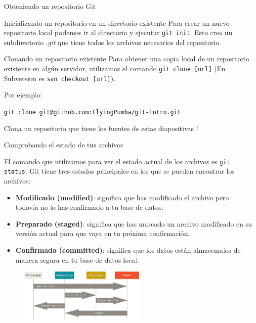 \documentclass{beamer}
\begin{document}
\begin{frame}{Obteniendo un repositorio Git}

    \begin{block}{Inicializando un repositorio en un directorio existente}
        Para crear un nuevo repositorio local podemos ir al directorio y ejecutar
        \texttt{git init}. Esto crea un subdirectorio \textit{.git} que tiene todos
        los archivos necesarios del repositorio.
    \end{block}

    \begin{block}{Clonando un repositorio existente}
        Para obtener una copia local de un repositorio existente en algún servidor,
        utilizamos el comando \texttt{git clone [url]} (En Subversion es \texttt{svn checkout [url]}).

        Por ejemplo:

        \vspace{0.5em}

        \texttt{git clone git@github.com:FlyingPumba/git-intro.git}

        \vspace{0.5em}

        Clona un repositorio que tiene los fuentes de estas diapositivas !

    \end{block}

\end{frame}

\begin{frame}{Comprobando el estado de tus archivos}

    El comando que utilizamos para ver el estado actual de los archivos es \texttt{git status}.
    Git tiene tres estados principales en los que se pueden encontrar los archivos:

    \begin{itemize}
        \item \textbf{Modificado (modified)}: significa que has modificado el archivo pero todavía no lo has confirmado a tu base de datos.
        \item \textbf{Preparado (staged)}: significa que has marcado un archivo modificado en su versión actual para que vaya en tu próxima confirmación.
        \item \textbf{Confirmado (committed)}: significa que los datos están almacenados de manera segura en tu base de datos local.
    \end{itemize}

    \begin{figure}[ht]
        \begin{center}
            \includegraphics[height=1in]{images/files-lifecycle.png}
        \end{center}
    \end{figure}

\end{frame}
\end{document}
